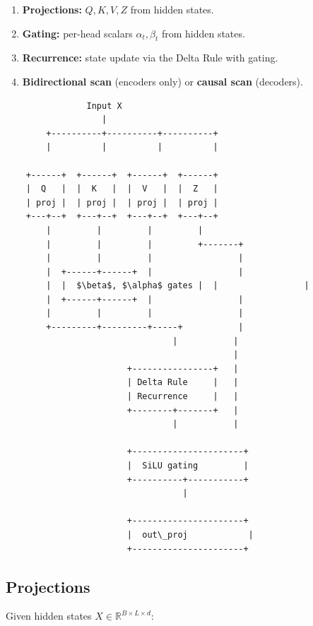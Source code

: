 \begin{enumerate}
\item \textbf{Projections:} $Q, K, V, Z$ from hidden states.
\item \textbf{Gating:} per-head scalars $\alpha_t, \beta_t$ from hidden states.
\item \textbf{Recurrence:} state update via the Delta Rule with gating.
\item \textbf{Bidirectional scan} (encoders only) or \textbf{causal scan} (decoders).

\end{enumerate}
\begin{lstlisting}
                Input X
                   |
        +----------+----------+----------+
        |          |          |          |
                                          
    +------+  +------+  +------+  +------+
    |  Q   |  |  K   |  |  V   |  |  Z   |
    | proj |  | proj |  | proj |  | proj |
    +---+--+  +---+--+  +---+--+  +---+--+
        |         |         |         |
        |         |         |         +-------+
        |         |         |                 |
        |  +------+------+  |                 |
        |  |  $\beta$, $\alpha$ gates |  |                 |
        |  +------+------+  |                 |
        |         |         |                 |
        +---------+---------+-----+           |
                                 |           |
                                             |
                        +----------------+   |
                        | Delta Rule     |   |
                        | Recurrence     |   |
                        +--------+-------+   |
                                 |           |
                                              
                        +----------------------+
                        |  SiLU gating         |
                        +----------+-----------+
                                   |
                                    
                        +----------------------+
                        |  out\_proj            |
                        +----------------------+
\end{lstlisting}

\subsection{Projections}

Given hidden states $X \in \mathbb{R}^{B \times L \times d}$:

